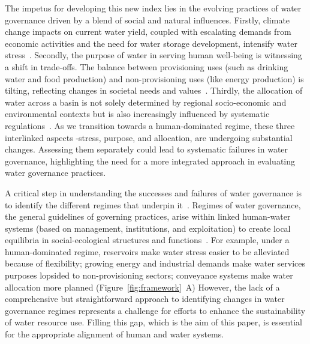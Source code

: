 The impetus for developing this new index lies in the evolving practices of water governance driven by a blend of social and natural influences.
Firstly, climate change impacts on current water yield, coupled with escalating demands from economic activities and the need for water storage development, intensify water stress~\cite{qin2019,wada2014,huang2021}.
Secondly, the purpose of water in serving human well-being is witnessing a shift in trade-offs. The balance between provisioning uses (such as drinking water and food production) and non-provisioning uses (like energy production) is tilting, reflecting changes in societal needs and values~\cite{liu2017,florke2018,jaeger2019}.
Thirdly, the allocation of water across a basin is not solely determined by regional socio-economic and environmental contexts but is also increasingly influenced by systematic regulations~\cite{schmandt2021,speed2013}.
As we transition towards a human-dominated regime, these three interlinked aspects -stress, purpose, and allocation, are undergoing substantial changes.
Assessing them separately could lead to systematic failures in water governance, highlighting the need for a more integrated approach in evaluating water governance practices.

A critical step in understanding the successes and failures of water governance is to identify the different regimes that underpin it~\cite{kjellen2015, grafton2013}.
Regimes of water governance, the general guidelines of governing practices, arise within linked human-water systems (based on management, institutions, and exploitation) to create local equilibria in social-ecological structures and functions~\cite{falkenmark2021,bressers2013,loch2020,pahl-wostl2007}.
For example, under a human-dominated regime, reservoirs make water stress easier to be alleviated because of flexibility; growing energy and industrial demands make water services purposes lopsided to non-provisioning sectors; conveyance systems make water allocation more planned (Figure~\ref{fig:framework}~A)
However, the lack of a comprehensive but straightforward approach to identifying changes in water governance regimes represents a challenge for efforts to enhance the sustainability of water resource use.
Filling this gap, which is the aim of this paper, is essential for the appropriate alignment of human and water systems.


